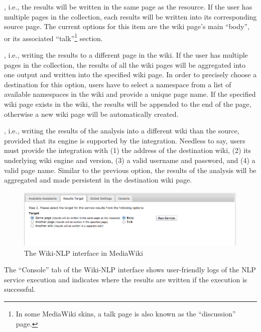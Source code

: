 \begin{description}\itemsep1mm
\item [``Same Page''], i.e., the results will be written in the same page as the resource. If the user has multiple pages in the collection, each results will be written into its corresponding source page. The current options for this item are the wiki page's main ``body'', or its associated ``talk''\footnote{In some MediaWiki skins, a talk page is also known as the ``discussion'' page.} section.
\item [``Another Page''], i.e., writing the results to a different page in the wiki. If the user has multiple pages in the collection, the results of all the wiki pages will be aggregated into one output and written into the specified wiki page. In order to precisely choose a destination for this option, users have to select a namespace from a list of available namespaces in the wiki and provide a unique page name. If the specified wiki page exists in the wiki, the results will be appended to the end of the page, otherwise a new wiki page will be automatically created.
\item [``Another Wiki''], i.e., writing the results of the analysis into a different wiki than the source, provided that its engine is supported by the integration. Needless to say, users must provide the integration with (1) the address of the destination wiki, (2) its underlying wiki engine and version, (3) a valid username and password, and (4) a valid page name. Similar to the previous option, the results of the analysis will be aggregated and made persistent in the destination wiki page.
\end{description}

\begin{figure}
\centering
\includegraphics[width=\textwidth]{pictures/semassist_target.png}
\caption{The Wiki-NLP interface in MediaWiki}
\label{fig:semassist_target}
\end{figure}

The ``Console'' tab of the Wiki-NLP interface shows user-friendly logs of the NLP service execution and indicates where the results are written if the execution is successful.

